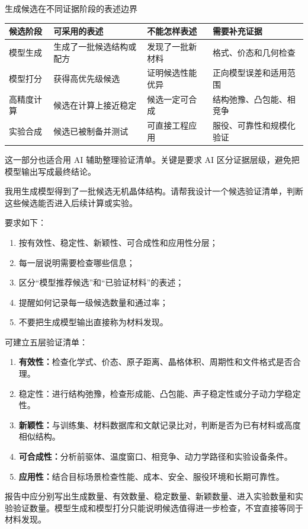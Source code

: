 \begin{formalTable}[htbp]
\caption{生成候选在不同证据阶段的表述边界}
\label{tab:generated-candidate-evidence}
\footnotesize
\begin{tabularx}{\textwidth}{@{}YYYY@{}}
\toprule
\textbf{候选阶段} & \textbf{可采用的表述} & \textbf{不能怎样表述} & \textbf{需要补充证据} \\
\midrule
模型生成 & 生成了一批候选结构或配方 & 发现了一批新材料 & 格式、价态和几何检查 \\
模型打分 & 获得高优先级候选 & 证明候选性能优异 & 正向模型误差和适用范围 \\
高精度计算 & 候选在计算上接近稳定 & 候选一定可合成 & 结构弛豫、凸包能、相竞争 \\
实验合成 & 候选已被制备并测试 & 可直接工程应用 & 服役、可靠性和规模化验证 \\
\bottomrule
\end{tabularx}
\end{formalTable}

这一部分也适合用 AI 辅助整理验证清单。关键是要求 AI 区分证据层级，避免把模型输出写成最终结论。

\begin{samepage}
\begin{userbox}
我用生成模型得到了一批候选无机晶体结构。请帮我设计一个候选验证清单，判断这些候选能否进入后续计算或实验。

要求如下：
\begin{enumerate}
\item 按有效性、稳定性、新颖性、可合成性和应用性分层；
\item 每一层说明需要检查哪些信息；
\item 区分“模型推荐候选”和“已验证材料”的表述；
\item 提醒如何记录每一级候选数量和通过率；
\item 不要把生成模型输出直接称为材料发现。
\end{enumerate}
\end{userbox}

\begin{aibox}
可建立五层验证清单：

\begin{enumerate}
\item \textbf{有效性：}检查化学式、价态、原子距离、晶格体积、周期性和文件格式是否合理。
\item 稳定性：进行结构弛豫，检查形成能、凸包能、声子稳定性或分子动力学稳定性。
\item \textbf{新颖性：}与训练集、材料数据库和文献记录比对，判断是否为已有材料或高度相似结构。
\item \textbf{可合成性：}分析前驱体、温度窗口、相竞争、动力学路径和实验设备条件。
\item \textbf{应用性：}结合目标场景检查性能、成本、安全、服役环境和长期可靠性。
\end{enumerate}

报告中应分别写出生成数量、有效数量、稳定数量、新颖数量、进入实验数量和实验验证数量。模型生成和模型打分只能说明候选值得进一步检查，不宜直接等同于材料发现。
\end{aibox}
\end{samepage}

